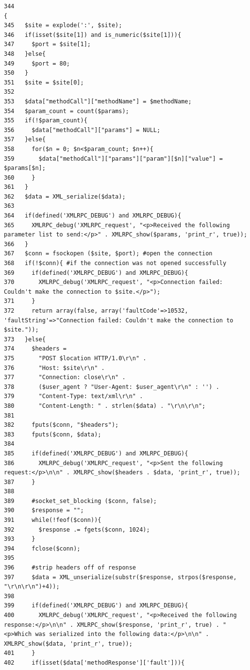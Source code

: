 \begin{Code}\begin{verbatim}344                                                                                           {
345   $site = explode(':', $site);
346   if(isset($site[1]) and is_numeric($site[1])){
347     $port = $site[1];
348   }else{
349     $port = 80;
350   }
351   $site = $site[0];
352 
353   $data["methodCall"]["methodName"] = $methodName;
354   $param_count = count($params);
355   if(!$param_count){
356     $data["methodCall"]["params"] = NULL;
357   }else{
358     for($n = 0; $n<$param_count; $n++){
359       $data["methodCall"]["params"]["param"][$n]["value"] = $params[$n];
360     }
361   }
362   $data = XML_serialize($data);
363 
364   if(defined('XMLRPC_DEBUG') and XMLRPC_DEBUG){
365     XMLRPC_debug('XMLRPC_request', "<p>Received the following parameter list to send:</p>" . XMLRPC_show($params, 'print_r', true));
366   }
367   $conn = fsockopen ($site, $port); #open the connection
368   if(!$conn){ #if the connection was not opened successfully
369     if(defined('XMLRPC_DEBUG') and XMLRPC_DEBUG){
370       XMLRPC_debug('XMLRPC_request', "<p>Connection failed: Couldn't make the connection to $site.</p>");
371     }
372     return array(false, array('faultCode'=>10532, 'faultString'=>"Connection failed: Couldn't make the connection to $site."));
373   }else{
374     $headers =
375       "POST $location HTTP/1.0\r\n" .
376       "Host: $site\r\n" .
377       "Connection: close\r\n" .
378       ($user_agent ? "User-Agent: $user_agent\r\n" : '') .
379       "Content-Type: text/xml\r\n" .
380       "Content-Length: " . strlen($data) . "\r\n\r\n";
381 
382     fputs($conn, "$headers");
383     fputs($conn, $data);
384 
385     if(defined('XMLRPC_DEBUG') and XMLRPC_DEBUG){
386       XMLRPC_debug('XMLRPC_request', "<p>Sent the following request:</p>\n\n" . XMLRPC_show($headers . $data, 'print_r', true));
387     }
388 
389     #socket_set_blocking ($conn, false);
390     $response = "";
391     while(!feof($conn)){
392       $response .= fgets($conn, 1024);
393     }
394     fclose($conn);
395 
396     #strip headers off of response
397     $data = XML_unserialize(substr($response, strpos($response, "\r\n\r\n")+4));
398 
399     if(defined('XMLRPC_DEBUG') and XMLRPC_DEBUG){
400       XMLRPC_debug('XMLRPC_request', "<p>Received the following response:</p>\n\n" . XMLRPC_show($response, 'print_r', true) . "<p>Which was serialized into the following data:</p>\n\n" . XMLRPC_show($data, 'print_r', true));
401     }
402     if(isset($data['methodResponse']['fault'])){

\end{verbatim}
\end{Code}
